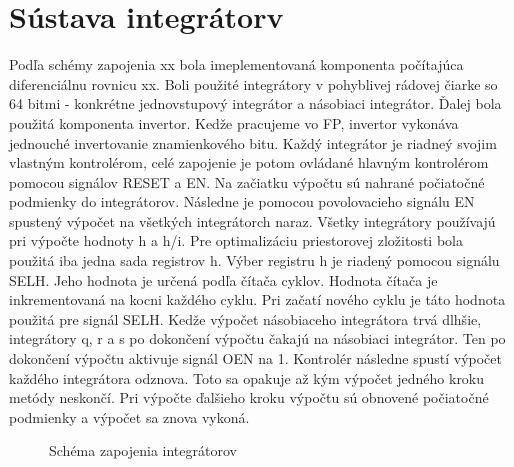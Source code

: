 \section{Sústava integrátorv} \label{impl_rovnice}
Podľa schémy zapojenia xx bola imeplementovaná komponenta počítajúca diferenciálnu rovnicu xx. Boli použité integrátory v pohyblivej rádovej čiarke so 64 bitmi - konkrétne jednovstupový integrátor a násobiaci integrátor. Ďalej bola použitá komponenta invertor. Kedže pracujeme vo FP, invertor vykonáva jednouché invertovanie znamienkového bitu. 
Každý integrátor je riadneý svojim vlastným kontrolérom, celé zapojenie je potom ovládané hlavným kontrolérom pomocou signálov RESET a EN. Na začiatku výpočtu sú nahrané počiatočné podmienky do integrátorov. Následne je pomocou povolovacieho signálu EN spustený výpočet na všetkých integrátorch naraz. Všetky integrátory používajú pri výpočte hodnoty h a h/i. Pre optimalizáciu priestorovej zložitosti bola použitá iba jedna sada registrov h. Výber registru h je riadený pomocou signálu SELH. Jeho hodnota je určená podľa čítača cyklov. Hodnota čítača je inkrementovaná na kocni každého cyklu. Pri začatí nového cyklu je táto hodnota použitá pre signál SELH.
Kedže výpočet násobiaceho integrátora trvá dlhšie, integrátory q, r a s po dokončení výpočtu čakajú na násobiaci integrátor. Ten po dokončení výpočtu aktivuje signál OEN na 1. Kontrolér následne spustí výpočet každého integrátora odznova. Toto sa opakuje až kým výpočet jedného kroku metódy neskončí. Pri výpočte ďalšieho kroku výpočtu sú obnovené počiatočné podmienky a výpočet sa znova vykoná.

\begin{figure}[h]
\centering
{}
\caption{Schéma zapojenia integrátorov}
\label{ppi_fp_sustava_impl}
\end{figure}



